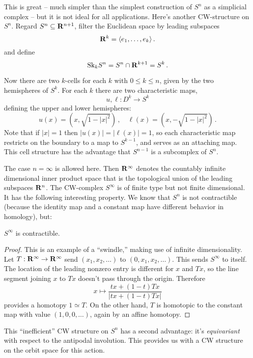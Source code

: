 This is great -- much simpler than the simplest construction of $S^n$ as 
a simplicial complex -- but it is not ideal for all applications.  
Here's another CW-structure on $S^n$. Regard $S^n\subseteq\mathbf R^{n+1}$, 
filter the Euclidean space by leading subspaces
\[
\mathbf R^k=\langle e_1,\ldots,e_k\rangle\,.
\]
and define 
\[
\mathrm{Sk}_kS^n=S^n\cap\mathbf R^{k+1}=S^k\,.
\]


Now there are two $k$-cells for each $k$ with $0\leq k\leq n$, given by the
two hemispheres of $S^k$. For each $k$ there are two characteristic maps,
\[
u,\ell:D^k\to S^k 
\]
defining the upper and lower hemispheres:
\[
u(x)=(x,\sqrt{1-|x|^2})\,,\quad\ell(x)=(x,-\sqrt{1-|x|^2})\,.
\]
Note that if $|x|=1$ then $|u(x)|=|\ell(x)|=1$, so each characteristic map
restricts on the boundary to a map to $S^{k-1}$, and serves as an attaching 
map. This cell structure has the advantage that $S^{n-1}$ is a subcomplex 
of $S^n$. 

The case $n=\infty$ is allowed here. Then $\mathbf R^\infty$ denotes the countably
infinite dimensional inner product space that is the topological union of the
leading subspaces $\mathbf R^n$. The CW-complex $S^\infty$ is of finite type but
not finite dimensional. It has the following interesting property. We know that
$S^n$ is not contractible (because the identity map and a constant map have 
different behavior in homology), but: 
\begin{prop}
$S^\infty$ is contractible.
\end{prop}
\begin{proof}
This is an example of a ``swindle,'' making use of infinite dimensionality. 
Let $T:\mathbf R^\infty\to\mathbf R^\infty$ send $(x_1,x_2,\ldots)$ to 
$(0,x_1,x_2,\ldots)$. This sends $S^\infty$ to itself. The location of the 
leading nonzero entry is different for $x$ and $Tx$, so the line segment 
joining $x$ to $Tx$ doesn't pass through the origin. Therefore 
\[
x\mapsto\frac{tx+(1-t)Tx}{|tx+(1-t)Tx|} 
\]
provides a homotopy $1\simeq T$. On the other hand, $T$ is homotopic to the 
constant map with value $(1,0,0,\ldots)$, again by an affine homotopy. 
\end{proof}

This ``inefficient'' CW structure on $S^n$ has a second advantage: it's
{\em equivariant} with respect to the antipodal involution. This provides us
with a CW structure on the orbit space for this action. 

